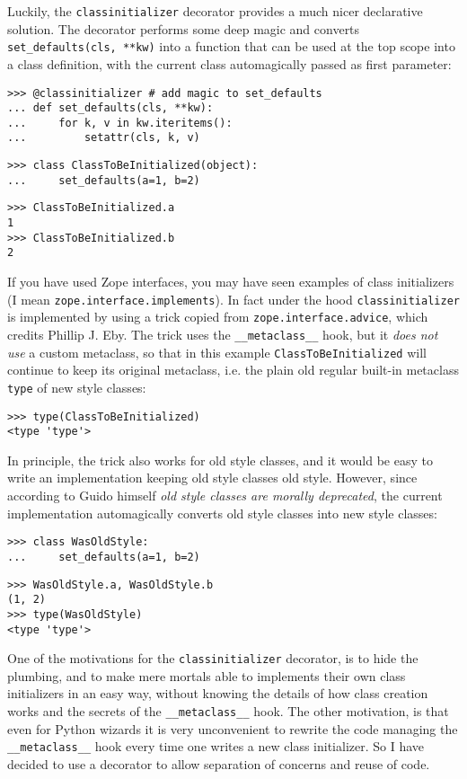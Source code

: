 \documentclass[10pt,a4paper,english]{article}
\begin{document}
Luckily, the \texttt{classinitializer} decorator provides a much nicer
declarative solution. The decorator performs some deep magic and converts
\texttt{set{\_}defaults(cls, **kw)} into a function that can be
used at the top scope into a class definition, with the current class
automagically passed as first parameter:
\begin{verbatim}>>> @classinitializer # add magic to set_defaults
... def set_defaults(cls, **kw):
...     for k, v in kw.iteritems():
...         setattr(cls, k, v)\end{verbatim}
\begin{verbatim}>>> class ClassToBeInitialized(object):
...     set_defaults(a=1, b=2)\end{verbatim}
\begin{verbatim}>>> ClassToBeInitialized.a
1
>>> ClassToBeInitialized.b
2\end{verbatim}

If you have used Zope interfaces, you may have seen examples of class
initializers (I mean \texttt{zope.interface.implements}). In fact under the hood
\texttt{classinitializer} is implemented by using a trick copied from
\texttt{zope.interface.advice}, which credits Phillip J. Eby. The trick
uses the \texttt{{\_}{\_}metaclass{\_}{\_}} hook, but it \emph{does not use} a custom
metaclass, so that in this example \texttt{ClassToBeInitialized} will
continue to keep its original metaclass, i.e. the plain old regular
built-in metaclass \texttt{type} of new style classes:
\begin{verbatim}>>> type(ClassToBeInitialized)
<type 'type'>\end{verbatim}

In principle, the trick also works for old style classes,
and it would be easy to write an implementation keeping old style
classes old style. However, since according  to Guido himself
\emph{old style classes are morally deprecated}, the current implementation
automagically converts old style classes into new style classes:
\begin{verbatim}>>> class WasOldStyle:
...     set_defaults(a=1, b=2)\end{verbatim}
\begin{verbatim}>>> WasOldStyle.a, WasOldStyle.b
(1, 2)
>>> type(WasOldStyle)
<type 'type'>\end{verbatim}

One of the motivations for the \texttt{classinitializer} decorator, is to hide the
plumbing, and to make mere mortals able to implements their own
class initializers in an easy way, without knowing the details of
how class creation works and the secrets of the \texttt{{\_}{\_}metaclass{\_}{\_}}
hook. The other motivation, is that even for Python wizards it is very
unconvenient to rewrite the code managing the \texttt{{\_}{\_}metaclass{\_}{\_}} hook
every time one writes a new class initializer. So I have decided to
use a decorator to allow separation of concerns and reuse of code.
\end{document}
